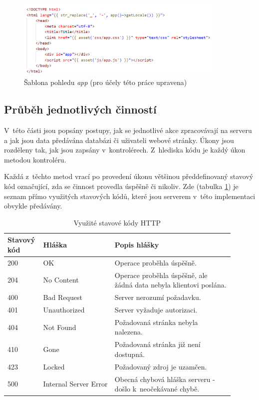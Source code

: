 	\begin{figure}[h]
		\centering
		\includegraphics[width=0.9\textwidth]{img/pohled_app.png}
		\caption{Šablona pohledu \textit{app} (pro účely této práce upravena)}
		\label{fig:pohled_app}
	\end{figure}
	
	\subsection{Průběh jednotlivých činností}\label{sec:be_prubeh_jednotl_cinnosti}
	V~této části jsou popsány postupy, jak se jednotlivé akce zpracovávají na serveru a jak jsou data předávána databázi či uživateli webové stránky. Úkony jsou rozděleny tak, jak jsou zapsány v~kontrolérech. Z~hlediska kódu je každý úkon metodou kontroléru.
	
	Každá z~těchto metod vrací po provedení úkonu většinou předdefinovaný stavový kód označující, zda se činnost provedla úspěšně či nikoliv. Zde (tabulka \ref{tab:http_stavove_kody}) je seznam přímo využitých stavových kódů, které jsou serverem v~této implementaci obvykle předávány.
	
	\begin{table}[H]
		\centering
		\begin{tabular}{ | p{0.1\linewidth} | p{0.3\linewidth} |  p{0.5\linewidth} |} 
			\hline
			\textbf{Stavový kód} & \textbf{Hláška} & \textbf{Popis hlášky} \\ 
			\hline
			200 & OK & Operace proběhla úspěšně. \\
			\hline
			204 & No Content & Operace proběhla úspěšně, ale žádná data nebyla klientovi poslána. \\
			\hline
			400 & Bad Request & Server nerozumí požadavku. \\
			\hline
			401 & Unauthorized & Server vyžaduje autorizaci. \\
			\hline
			404 & Not Found & Požadovaná stránka nebyla nalezena. \\
			\hline
			410 & Gone & Požadovaná stránka již není dostupná. \\
			\hline
			423 & Locked & Požadovaný zdroj je uzamčen. \\
			\hline
			500 & Internal Server Error & Obecná chybová hláška serveru - došlo k~neočekávané chybě. \\
			\hline
		\end{tabular}
		\caption{Využité stavové kódy HTTP \cite{HTTPKody1}\cite{HTTPKody2}}
		\label{tab:http_stavove_kody}
	\end{table}

